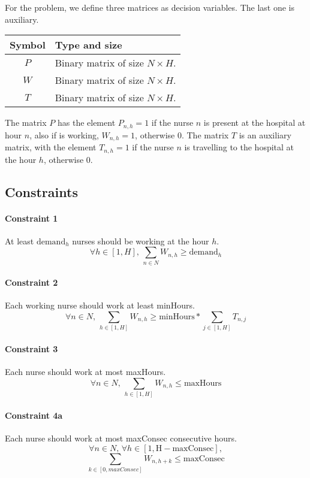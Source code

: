 \documentclass[12pt,a4paper]{article}
\begin{document}
For the problem, we define three matrices as decision variables. The last one is
auxiliary.
%
\begin{table}[h]
\centering
\begin{tabular}{c l}
\toprule
Symbol & Type and size \\
\midrule
$P$ & Binary matrix of size $N \times H$.\\
$W$ & Binary matrix of size $N \times H$.\\
$T$ & Binary matrix of size $N \times H$.\\
\bottomrule
\end{tabular}
\end{table}

\noindent
The matrix $P$ has the element $P_{n,h} = 1$ if the nurse $n$ is present at the hospital
at hour $n$, also if is working, $W_{n,h} = 1$, otherwise 0.
%
The matrix $T$ is an auxiliary matrix, with the element $T_{n,h} = 1$ if the
nurse $n$ is travelling to the hospital at the hour $h$, otherwise 0.

\subsection{Constraints}

\paragraph{Constraint 1} At least $\textrm{demand}_h$ nurses should be working
at the hour $h$.
$$ \forall h\in [1, H],\, \sum_{n \in N} W_{n,h} \ge \textrm{demand}_h$$
%
\paragraph{Constraint 2} Each working nurse should work at least minHours.
$$ \forall n \in N,\, \sum_{h \in [1, H]} W_{n,h} \ge
  \textrm{minHours} * \sum_{j \in [1, H]} T_{n,j} $$
%
\paragraph{Constraint 3} Each nurse should work at most maxHours.
$$ \forall n \in N,\, \sum_{h \in [1, H]} W_{n,h} \le \textrm{maxHours} $$
%
\paragraph{Constraint 4a} Each nurse should work at most maxConsec consecutive
hours.
$$ \forall n \in N,\, \forall h \in [1, \textrm{H} - \textrm{maxConsec}],$$
$$\sum_{k \in [0, maxConsec]} W_{n, h+k} \le \textrm{maxConsec}
$$
%
\end{document}
